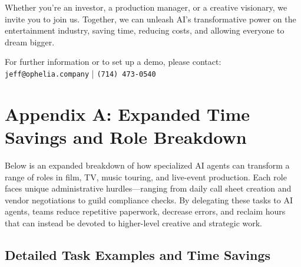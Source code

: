 \documentclass[11pt]{article}
\begin{document}
Whether you’re an investor, a production manager, or a creative visionary, we invite you to join us. Together, we can unleash AI’s transformative power on the entertainment industry, saving time, reducing costs, and allowing everyone to dream bigger.

\bigskip

For further information or to set up a demo, please contact:\\[0.5em]
\texttt{jeff@ophelia.company} \quad | \quad \texttt{(714) 473-0540}

\appendix

\clearpage
\section{Appendix A: Expanded Time Savings and Role Breakdown}
\label{appendix:extended-time-savings}

Below is an expanded breakdown of how specialized AI agents can transform a range of roles in film, TV, music touring, and live-event production. Each role faces unique administrative hurdles—ranging from daily call sheet creation and vendor negotiations to guild compliance checks. By delegating these tasks to AI agents, teams reduce repetitive paperwork, decrease errors, and reclaim hours that can instead be devoted to higher-level creative and strategic work.



\subsection{Detailed Task Examples and Time Savings}
\end{document}
